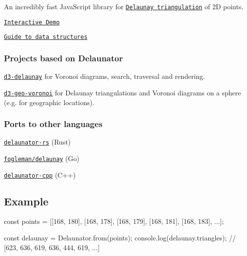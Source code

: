 An incredibly fast Java\+Script library for \href{https://en.wikipedia.org/wiki/Delaunay_triangulation}{\tt Delaunay triangulation} of 2D points.


\begin{DoxyItemize}
\item \href{https://mapbox.github.io/delaunator/demo.html}{\tt Interactive Demo}
\item \href{https://mapbox.github.io/delaunator/}{\tt Guide to data structures}
\end{DoxyItemize}

\subsubsection*{Projects based on Delaunator}


\begin{DoxyItemize}
\item \href{https://github.com/d3/d3-delaunay}{\tt d3-\/delaunay} for Voronoi diagrams, search, traversal and rendering.
\item \href{https://github.com/Fil/d3-geo-voronoi}{\tt d3-\/geo-\/voronoi} for Delaunay triangulations and Voronoi diagrams on a sphere (e.\+g. for geographic locations).
\end{DoxyItemize}

\subsubsection*{Ports to other languages}


\begin{DoxyItemize}
\item \href{https://github.com/mourner/delaunator-rs}{\tt delaunator-\/rs} (Rust)
\item \href{https://github.com/fogleman/delaunay}{\tt fogleman/delaunay} (Go)
\item \href{https://github.com/delfrrr/delaunator-cpp}{\tt delaunator-\/cpp} (C++)
\end{DoxyItemize}



\subsection*{Example}


\begin{DoxyCode}
const points = [[168, 180], [168, 178], [168, 179], [168, 181], [168, 183], ...];

const delaunay = Delaunator.from(points);
console.log(delaunay.triangles);
// [623, 636, 619,  636, 444, 619, ...]
\end{DoxyCode}


